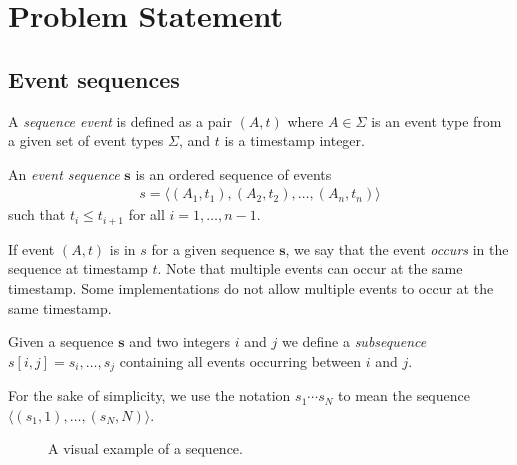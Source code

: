 \section{Problem Statement}

\subsection{Event sequences}

\begin{definition}
A \emph{sequence event} is defined as a pair $ (A, t) $ where $ A \in \Sigma $ is an event type from a given set of event types $ \Sigma $, and $ t $ is a timestamp integer.
\end{definition}

\begin{definition}
An \emph{event sequence} $ \boldsymbol{s} $ is an ordered sequence of events
\begin{align*}
s = \langle (A_1, t_1), (A_2, t_2), \ldots, (A_n, t_n) \rangle
\end{align*}
such that $ t_i \leq t_{i + 1} $ for all $ i = 1, \ldots, n - 1 $.
\end{definition}

If event $ (A, t) $ is in $ s $ for a given sequence $ \boldsymbol{s} $, we say that the event \emph{occurs} in the sequence at timestamp $ t $. Note that multiple events can occur at the same timestamp. Some implementations do not allow multiple events to occur at the same timestamp.

Given a sequence $ \boldsymbol{s} $ and two integers $ i $ and $ j $ we define a \emph{subsequence} $ s[i, j] = s_i, \ldots, s_j $ containing all events occurring between $ i $ and $ j $.

For the sake of simplicity, we use the notation $ s_1 \cdots s_N $ to mean the sequence $ \langle (s_1, 1), \ldots, (s_N, N) \rangle $.

\begin{figure}
\centering


\caption{A visual example of a sequence.}

\label{fig:event-sequence}
\end{figure}

